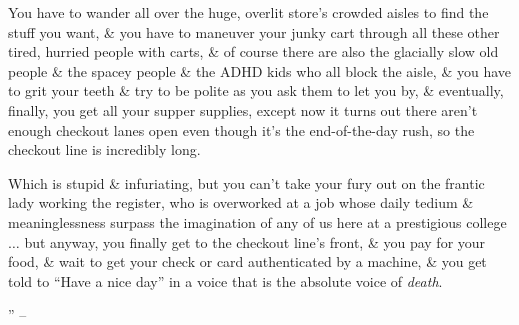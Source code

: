 \documentclass{article}
\numberwithin{equation}{section}
\begin{document}
You have to wander all over the huge, overlit store's crowded aisles to find the stuff you want, \& you have to maneuver your junky cart through all these other tired, hurried people with carts, \& of course there are also the glacially slow old people \& the spacey people \& the ADHD kids who all block the aisle, \& you have to grit your teeth \& try to be polite as you ask them to let you by, \& eventually, finally, you get all your supper supplies, except now it turns out there aren't enough checkout lanes open even though it's the end-of-the-day rush, so the checkout line is incredibly long.

Which is stupid \& infuriating, but you can't take your fury out on the frantic lady working the register, who is overworked at a job whose daily tedium \& meaninglessness surpass the imagination of any of us here at a prestigious college $\ldots$ but anyway, you finally get to the checkout line's front, \& you pay for your food, \& wait to get your check or card authenticated by a machine, \& you get told to ``Have a nice day'' in a voice that is the absolute voice of \textit{death}.

'' -- \cite{Wallace2009}


\printbibliography[heading=bibintoc]
	
\end{document}
